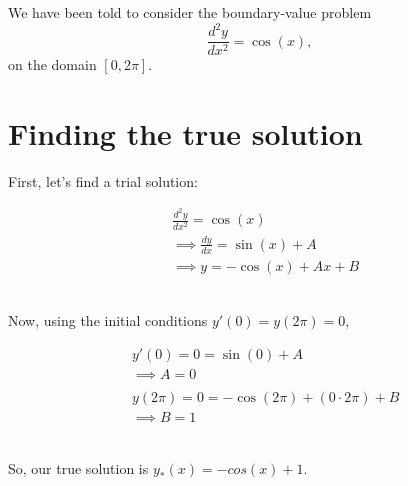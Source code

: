 \documentclass[../main.tex]{subfiles}
\begin{document}
    We have been told to consider the boundary-value problem
    \[
        \frac{d^{2}y}{dx^{2}} = \cos(x),
    \]
    on the domain $[0, 2\pi]$.

    \section{Finding the true solution}\label{sec:bvp-finding-true-solution}
    First, let's find a trial solution:
    \begin{center*}
        \begin{align*}
            & \frac{d^{2}y}{dx^{2}} = \cos(x) \\
            & \implies \frac{dy}{dx} = \sin(x) + A \\
            & \implies y = -\cos(x) + Ax + B
        \end{align*}
    \end{center*}\\
    Now, using the initial conditions $y'(0) = y(2\pi) = 0$,
    \begin{center*}
        \begin{align*}
            & y'(0) = 0 = \sin(0) + A \\
            & \implies A = 0 \\
            \\
            & y(2\pi) = 0 = -\cos(2\pi) + (0 \cdot 2\pi) + B \\
            & \implies B = 1
        \end{align*}
    \end{center*}\\
    So, our true solution is $y_{*}(x) = -cos(x) + 1$.
\end{document}
